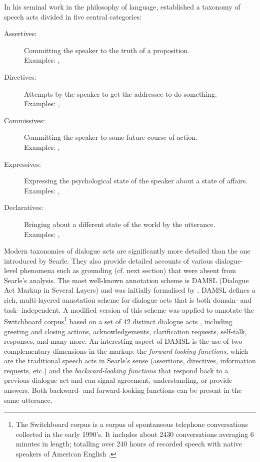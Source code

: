 In his seminal work in the philosophy of language, \cite{Searle1979} established a taxonomy of speech acts divided in five central categories:
\begin{description}
\item[Assertives: ] Committing the speaker to the truth of a proposition. \\
Examples: , 
\item[Directives: ]  Attempts by the speaker to get the addressee to do something. \\ Examples:  , 
\item[Commissives: ] Committing the speaker to some future course of action. \\ Examples: , 
\item[Expressives: ] Expressing the psychological state of the speaker about a state of affairs. \\ Examples: , 
\item[Declaratives: ] Bringing about a different state of the world by the utterance. \\ Examples: , 
\end{description}

Modern taxonomies of dialogue acts are significantly more detailed than the one introduced by Searle.  They also provide detailed accounts of various dialogue-level phenomena such as grounding (cf. next section) that were absent from Searle's analysis. The most well-known annotation scheme is DAMSL (Dialogue Act Markup in Several Layers) and was initially formalised by \cite{Core1997}.  DAMSL defines a rich, multi-layered annotation scheme for dialogue acts that is both domain- and task- independent.  A modified version of this scheme was applied to annotate the Switchboard corpus\footnote{The Switchboard corpus is a corpus of spontaneous telephone conversations collected in the early 1990's.  It includes about 2430 conversations averaging 6 minutes in length; totalling over 240 hours of recorded speech with native speakers of American English \citep{Godfrey1992}.} based on a set of 42 distinct dialogue acts \citep{Jurafsky1997}, including greeting and closing actions, acknowledgements, clarification requests, self-talk, responses, and many more.  An interesting aspect of DAMSL is the use of two complementary dimensions in the markup: the \textit{forward-looking functions}, which are the traditional speech acts in Searle's sense (assertions, directives, information requests, etc.) and the \textit{backward-looking functions} that respond back to a previous dialogue act and can signal agreement, understanding, or provide answers.  Both backward- and forward-looking functions can be present in the same utterance. 

